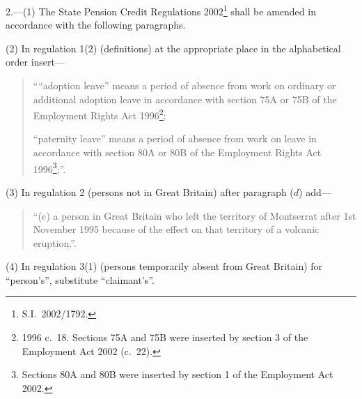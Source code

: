 \documentclass[12pt,a4paper]{article}
\begin{document}
2.---(1)  The State Pension Credit Regulations 2002\footnote{S.I.\ 2002/1792.} shall be amended in accordance with the following paragraphs.

(2) In regulation 1(2) (definitions) at the appropriate place in the alphabetical order insert—
\begin{quotation}
““adoption leave” means a period of absence from work on ordinary or additional adoption leave in accordance with section 75A or 75B of the Employment Rights Act 1996\footnote{1996 c.\ 18. Sections 75A and 75B were inserted by section 3 of the Employment Act 2002 (c.\ 22).};

“paternity leave” means a period of absence from work on leave in accordance with section 80A or 80B of the Employment Rights Act 1996\footnote{Sections 80A and 80B were inserted by section 1 of the Employment Act 2002.};”.
\end{quotation}

(3) In regulation 2 (persons not in Great Britain) after paragraph ($d$)  add—
\begin{quotation}
“($e$) a person in Great Britain who left the territory of Montserrat after 1st November 1995 because of the effect on that territory of a volcanic eruption.”.
\end{quotation}

(4) In regulation 3(1) (persons temporarily absent from Great Britain) for “person's”, substitute “claimant's”.
\end{document}
